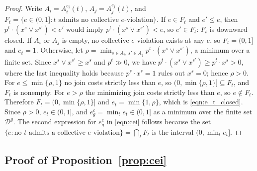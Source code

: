 \documentclass[11 pt]{article}
\begin{document}
\begin{proof}
Write $A_{i} = A^{e_i}_{i}(t)$, $A_{j} = A^{e_j}_{j}(t)$, and $F_{t} = \{ e \in (0,1] : t \text{ admits no collective } e\text{-violation} \}$. If $e \in F_{t}$ and $e' \leq e$, then $p^{t} \cdot (x^{s} \vee x^{s'}) < e'$ would imply $p^{t} \cdot (x^{s} \vee x^{s'}) < e$, so $e' \in F_{t}$: $F_{t}$ is downward closed. If $A_{i}$ or $A_{j}$ is empty, no collective $e$-violation exists at any $e$, so $F_{t} = (0,1]$ and $e_{t} = 1$. Otherwise, let $\rho = \min_{s \in A_{i},\, s' \in A_{j}} p^{t} \cdot (x^{s} \vee x^{s'})$, a minimum over a finite set. Since $x^{s} \vee x^{s'} \geq x^{s}$ and $p^{t} \gg 0$, we have $p^{t} \cdot (x^{s} \vee x^{s'}) \geq p^{t} \cdot x^{s} > 0$, where the last inequality holds because $p^{s} \cdot x^{s} = 1$ rules out $x^{s} = 0$; hence $\rho > 0$. For $e \leq \min\{\rho, 1\}$ no join costs strictly less than $e$, so $(0, \min\{\rho, 1\}] \subseteq F_{t}$, and $F_{t}$ is nonempty. For $e > \rho$ the minimizing join costs strictly less than $e$, so $e \notin F_{t}$. Therefore $F_{t} = (0, \min\{\rho, 1\}]$ and $e_{t} = \min\{1, \rho\}$, which is \eqref{eqn:e_t_closed}. Since $\rho > 0$, $e_{t} \in (0,1]$, and $e^{c}_{g} = \min_{t} e_{t} \in (0,1]$ as a minimum over the finite set $\mathcal{D}^{g}$. The second expression for $e^{c}_{g}$ in \eqref{eqn:cei} follows because the set $\{ e : \text{no } t \text{ admits a collective } e\text{-violation} \} = \bigcap_{t} F_{t}$ is the interval $(0, \min_{t} e_{t}]$.
\end{proof}

\subsection{Proof of Proposition~\ref{prop:cei}}
\end{document}
